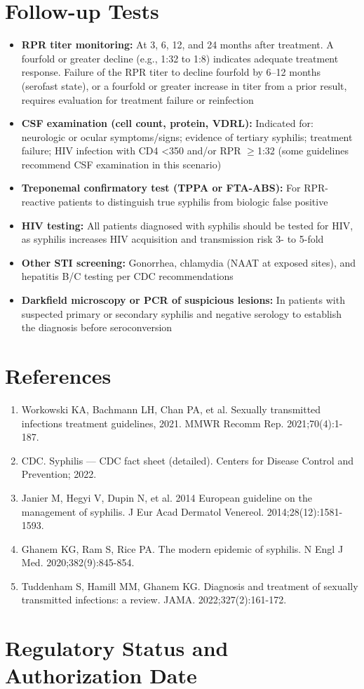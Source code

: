 \section*{Follow-up Tests}
\begin{itemize}
  \item \textbf{RPR titer monitoring:} At 3, 6, 12, and 24 months after treatment. A fourfold or greater decline (e.g., 1:32 to 1:8) indicates adequate treatment response. Failure of the RPR titer to decline fourfold by 6--12 months (serofast state), or a fourfold or greater increase in titer from a prior result, requires evaluation for treatment failure or reinfection
  \item \textbf{CSF examination (cell count, protein, VDRL):} Indicated for: neurologic or ocular symptoms/signs; evidence of tertiary syphilis; treatment failure; HIV infection with CD4 <350 and/or RPR $\geq$1:32 (some guidelines recommend CSF examination in this scenario)
  \item \textbf{Treponemal confirmatory test (TPPA or FTA-ABS):} For RPR-reactive patients to distinguish true syphilis from biologic false positive
  \item \textbf{HIV testing:} All patients diagnosed with syphilis should be tested for HIV, as syphilis increases HIV acquisition and transmission risk 3- to 5-fold
  \item \textbf{Other STI screening:} Gonorrhea, chlamydia (NAAT at exposed sites), and hepatitis B/C testing per CDC recommendations
  \item \textbf{Darkfield microscopy or PCR of suspicious lesions:} In patients with suspected primary or secondary syphilis and negative serology to establish the diagnosis before seroconversion
\end{itemize}

\section*{References}
\begin{enumerate}
  \item Workowski KA, Bachmann LH, Chan PA, et al. Sexually transmitted infections treatment guidelines, 2021. MMWR Recomm Rep. 2021;70(4):1-187.
  \item CDC. Syphilis --- CDC fact sheet (detailed). Centers for Disease Control and Prevention; 2022.
  \item Janier M, Hegyi V, Dupin N, et al. 2014 European guideline on the management of syphilis. J Eur Acad Dermatol Venereol. 2014;28(12):1581-1593.
  \item Ghanem KG, Ram S, Rice PA. The modern epidemic of syphilis. N Engl J Med. 2020;382(9):845-854.
  \item Tuddenham S, Hamill MM, Ghanem KG. Diagnosis and treatment of sexually transmitted infections: a review. JAMA. 2022;327(2):161-172.
\end{enumerate}

\clearpage
\section*{Regulatory Status and Authorization Date}

\clearpage
